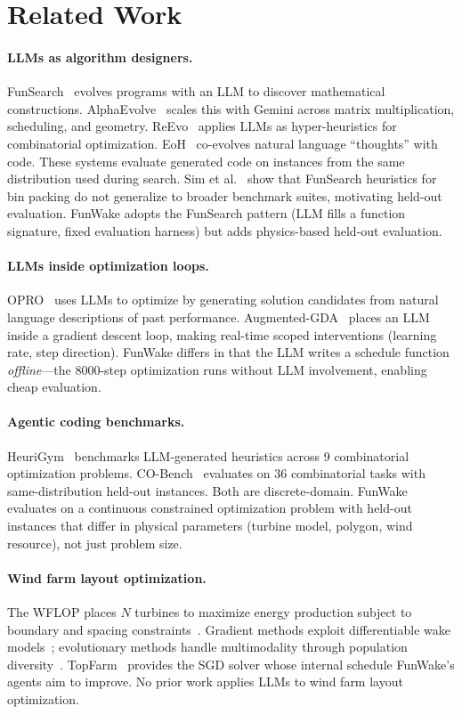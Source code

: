 \section{Related Work}
\label{sec:related}

\paragraph{LLMs as algorithm designers.}
FunSearch~\cite{fawzi2024funsearch} evolves programs with an LLM to
discover mathematical constructions. AlphaEvolve~\cite{deepmind2025alphaevolve}
scales this with Gemini across matrix multiplication, scheduling, and
geometry. ReEvo~\cite{ye2024reevo} applies LLMs as hyper-heuristics
for combinatorial optimization. EoH~\cite{liu2024eoh} co-evolves
natural language ``thoughts'' with code. These systems evaluate
generated code on instances from the same distribution used during
search. Sim et al.~\cite{sim2025beyondhype} show that FunSearch
heuristics for bin packing do not generalize to broader benchmark
suites, motivating held-out evaluation. FunWake adopts the
FunSearch pattern (LLM fills a function signature, fixed evaluation
harness) but adds physics-based held-out evaluation.

\paragraph{LLMs inside optimization loops.}
OPRO~\cite{yang2024opro} uses LLMs to optimize by generating solution
candidates from natural language descriptions of past performance.
Augmented-GDA~\cite{augmentedgda2025} places an LLM inside a gradient
descent loop, making real-time scoped interventions (learning rate,
step direction). FunWake differs in that the LLM writes a schedule
function \emph{offline}---the 8000-step optimization runs without
LLM involvement, enabling cheap evaluation.

\paragraph{Agentic coding benchmarks.}
HeuriGym~\cite{yao2025heurigym} benchmarks LLM-generated heuristics
across 9 combinatorial optimization problems.
CO-Bench~\cite{cobench2025} evaluates on 36 combinatorial tasks with
same-distribution held-out instances. Both are discrete-domain.
FunWake evaluates on a continuous constrained optimization problem
with held-out instances that differ in physical parameters (turbine
model, polygon, wind resource), not just problem size.

\paragraph{Wind farm layout optimization.}
The WFLOP places $N$ turbines to maximize energy production subject to
boundary and spacing constraints~\cite{mosetti1994optimization}.
Gradient methods exploit differentiable wake
models~\cite{thomas2023improving,quick2024design}; evolutionary
methods handle multimodality through population
diversity~\cite{chen2013wind}. TopFarm~\cite{pedersen2019topfarm}
provides the SGD solver whose internal schedule FunWake's agents
aim to improve. No prior work applies LLMs to wind farm layout
optimization.
